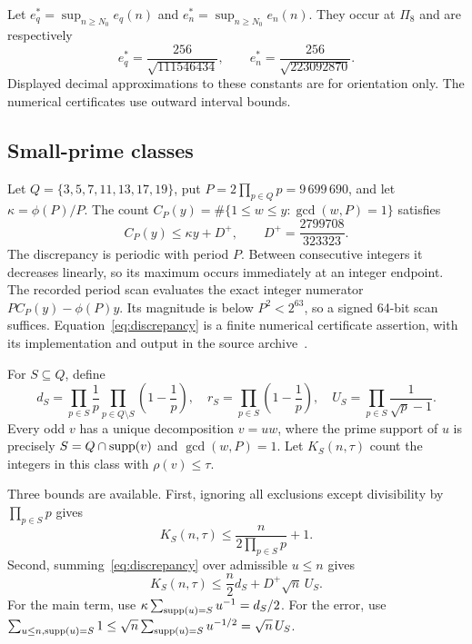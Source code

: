 Let $e_q^*=\sup_{n\ge N_0}e_q(n)$ and $e_n^*=\sup_{n\ge N_0}e_n(n)$. They occur at $\Pi_8$ and are respectively
\[
 e_q^*=\frac{256}{\sqrt{111546434}},\qquad
 e_n^*=\frac{256}{\sqrt{223092870}}.
\]
Displayed decimal approximations to these constants are for orientation only. The numerical certificates use outward interval bounds.

\subsection{Small-prime classes}
Let $Q=\{3,5,7,11,13,17,19\}$, put $P=2\prod_{p\in Q}p=9\,699\,690$, and let $\kappa=\phi(P)/P$. The count
$C_P(y)=\#\{1\le w\le y:\gcd(w,P)=1\}$ satisfies
\begin{equation}\label{eq:discrepancy}
 C_P(y)\le\kappa y+D^+,\qquad D^+=\frac{2799708}{323323}.
\end{equation}
The discrepancy is periodic with period $P$. Between consecutive integers it decreases linearly, so its maximum occurs immediately at an integer endpoint. The recorded period scan evaluates the exact integer numerator $P C_P(y)-\phi(P)y$. Its magnitude is below $P^2<2^{63}$, so a signed 64-bit scan suffices. Equation~\eqref{eq:discrepancy} is a finite numerical certificate assertion, with its implementation and output in the source archive~\cite{Archive}.

For $S\subseteq Q$, define
\[
 d_S=\prod_{p\in S}\frac1p\prod_{p\in Q\setminus S}\left(1-\frac1p\right),
 \quad r_S=\prod_{p\in S}\left(1-\frac1p\right),
 \quad U_S=\prod_{p\in S}\frac1{\sqrt p-1}.
\]
Every odd $v$ has a unique decomposition $v=uw$, where the prime support of $u$ is precisely $S=Q\cap\operatorname{supp}(v)$ and $\gcd(w,P)=1$. Let $K_S(n,\tau)$ count the integers in this class with $\rho(v)\le\tau$.

Three bounds are available. First, ignoring all exclusions except divisibility by $\prod_{p\in S}p$ gives
\begin{equation}\label{eq:trivialclass}
 K_S(n,\tau)\le\frac{n}{2\prod_{p\in S}p}+1.
\end{equation}
Second, summing~\eqref{eq:discrepancy} over admissible $u\le n$ gives
\begin{equation}\label{eq:classcount}
 K_S(n,\tau)\le\frac n2d_S+D^+\sqrt n\,U_S.
\end{equation}
For the main term, use $\kappa\sum_{\operatorname{supp}(u)=S}u^{-1}=d_S/2$. For the error, use
$\sum_{u\le n,\operatorname{supp}(u)=S}1\le\sqrt n\sum_{\operatorname{supp}(u)=S}u^{-1/2}=\sqrt n\,U_S$.

